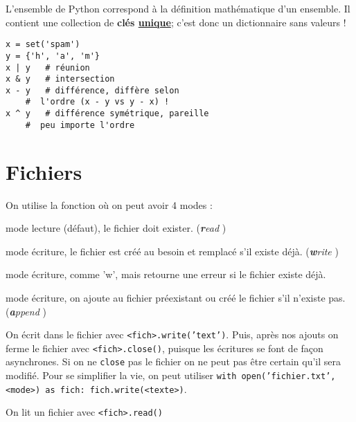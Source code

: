 \documentclass[10pt, french]{article}
\begin{document}
\begin{multicols*}{2}
\begin{definitionNOHFILL}
L'ensemble de Python correspond à la définition mathématique d'un ensemble. Il contient une collection de \textbf{clés \underline{unique}}; c'est donc un dictionnaire sans valeurs ! 

\bigskip

\begin{definitionNOHFILLprop}
\begin{lstlisting}
x = set('spam')
y = {'h', 'a', 'm'}
x | y	# réunion
x & y	# intersection
x - y	# différence, diffère selon 
	#  l'ordre (x - y vs y - x) ! 
x ^ y	# différence symétrique, pareille 
	#  peu importe l'ordre
\end{lstlisting}
\end{definitionNOHFILLprop}
\end{definitionNOHFILL}



\newpage
\section{Fichiers}
On utilise la fonction  où on peut avoir 4 modes : 
\begin{description}[font = \ttfamily]
	\item['r']	mode lecture (défaut), le fichier doit exister. (\og \textit{\textbf{r}ead} \fg{})
	\item['w']	mode écriture, le fichier est créé au besoin et remplacé s'il existe déjà. (\og \textit{\textbf{w}rite} \fg{})
	\item['x']	mode écriture, comme 'w', mais retourne une erreur si le fichier existe déjà.
	\item['a']	mode écriture, on ajoute au fichier préexistant ou créé le fichier s'il n'existe pas. (\og \textit{\textbf{a}ppend} \fg{})
\end{description}

On écrit dans le fichier avec \texttt{<fich>.write('text')}. Puis, après nos ajouts on ferme le fichier avec \texttt{<fich>.close()}, puisque les écritures se font de façon asynchrones. Si on ne \texttt{close} pas le fichier on ne peut pas être certain qu'il sera modifié. Pour se simplifier la vie, on peut utiliser \texttt{with open('fichier.txt', <mode>) as fich: fich.write(<texte>)}.

\bigskip

On lit un fichier avec \texttt{<fich>.read()}


\end{multicols*}
\end{document}
